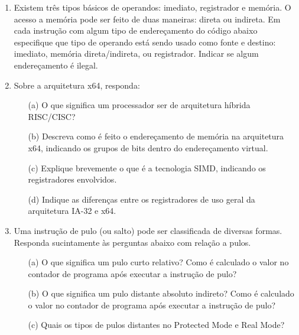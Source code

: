 \begin{enumerate}
    \item
    Existem três tipos básicos de operandos: imediato, registrador e memória.
    O acesso a memória pode ser feito de duas maneiras: direta ou indireta.
    Em cada instrução com algum tipo de endereçamento 
    do código abaixo especifique que tipo de operando 
    está sendo usado como fonte e destino:
    imediato, memória direta/indireta, ou registrador.
    Indicar se algum endereçamento é ilegal. 


    \item
    Sobre a arquitetura x64, responda:
    \begin{itemize}
        \item [(a)]
        O que significa um processador ser de arquitetura híbrida RISC/CISC?

        \item [(b)]
        Descreva como é feito o endereçamento de memória na arquitetura x64,
        indicando os grupos de bits dentro do endereçamento virtual.

        \item [(c)]
        Explique brevemente o que é a tecnologia SIMD,
        indicando os registradores envolvidos.

        \item [(d)]
        Indique as diferenças entre os registradores 
        de uso geral da arquitetura IA-32 e x64.    
    \end{itemize}

    \item
    Uma instrução de pulo (ou salto) pode ser classificada de diversas formas.
    Responda sucintamente às perguntas abaixo com relação a pulos.
    \begin{itemize}
        \item [(a)]
        O que significa um pulo curto relativo? 
        Como é calculado o valor no contador de programa 
        após executar a instrução de pulo?

        \item [(b)]
        O que significa um pulo distante absoluto indireto?
        Como é calculado o valor no contador de programa 
        após executar a instrução de pulo?

        \item [(c)]
        Quais os tipos de pulos distantes no Protected Mode e Real Mode?
    \end{itemize}
























\end{enumerate}

